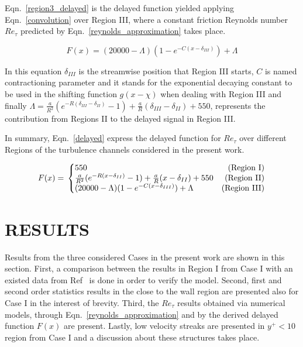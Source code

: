\documentclass[twocolumn,10pt]{asme2e}
\begin{document}
Eqn.~\ref{region3_delayed} is the delayed function yielded applying Eqn.~\ref{convolution} over Region III, where a constant friction Reynolds number \(Re_{\tau}\) predicted by Eqn.~\ref{reynolds_approximation} takes place.

\begin{equation}
F(x)= (20000-{\Lambda})(1-e^{-C(x-{\delta}_{III})})+{\Lambda}
\label{region3_delayed}
\end{equation}

In this equation \({\delta}_{III}\) is the streamwise position that Region III starts, \(C\) is named contractioning parameter and it stands for the exponential decaying constant to be used in the shifting function \(g(x-\chi)\) when dealing with Region III and finally
 \({\Lambda}=\frac{a}{R^2}(e^{-R({\delta}_{III}-{\delta}_{II})}-1)+\frac{a}{R}({\delta}_{III}-{\delta}_{II})+550\), represents the contribution from Regions II to the delayed signal in Region III.

In summary, Eqn.~\ref{delayed} express the delayed function for \(Re_{\tau}\) over different Regions of the turbulence channels considered in the present work. 

\begin{equation} \label{delayed}
F(x) = \\
    \left\{\begin{array}{@{}lr@{}}
        550  & \text{(Region I)}\\
        \frac{a}{R^2}(e^{-R(x-{\delta}_{II})}-1)+\frac{a}{R}(x-{\delta}_{II})+550 & \text{(Region II)}\\
        (20000-{\Lambda})(1-e^{-C(x-{\delta}_{III})})+{\Lambda} &  \text{(Region III)}
\end{array}\right.
\end{equation}




\section*{RESULTS}

Results from the three considered Cases in the present work are shown in this section. First, a comparison between the results in Region I from Case I with an existed data from Ref~\cite{iwamoto2002} is done in order to verify the model. Second, first and second order statistics results in the close to the wall region are presented also for Case I in the interest of brevity. Third, the \(Re_{\tau}\) results obtained via numerical models, through Eqn.~\ref{reynolds_approximation} and by the derived delayed function \(F(x)\) are present. Lastly, low velocity streaks are presented in \(y^+<10\) region from Case I and a discussion about these structures takes place.
\end{document}
